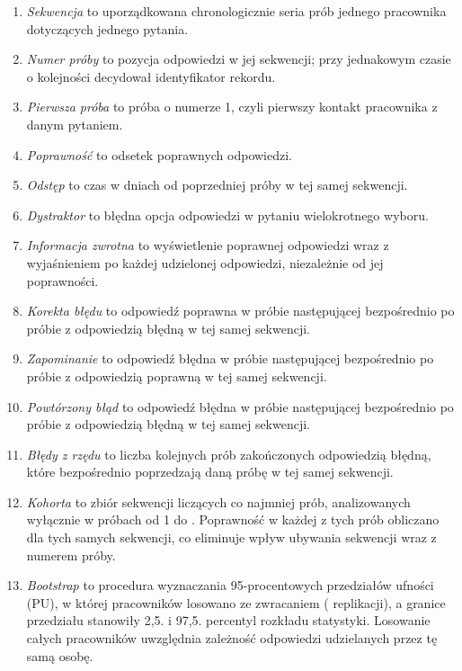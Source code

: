 \begin{enumerate}[label=\Roman*.]
  \item \emph{Sekwencja} to uporządkowana chronologicznie seria prób jednego pracownika dotyczących
  jednego pytania.
  \item \emph{Numer próby} to pozycja odpowiedzi w jej sekwencji; przy jednakowym czasie o kolejności
  decydował identyfikator rekordu.
  \item \emph{Pierwsza próba} to próba o numerze 1, czyli pierwszy kontakt pracownika z danym pytaniem.
  \item \emph{Poprawność} to odsetek poprawnych odpowiedzi.
  \item \emph{Odstęp} to czas w dniach od poprzedniej próby w tej samej sekwencji.
  \item \emph{Dystraktor} to błędna opcja odpowiedzi w pytaniu wielokrotnego wyboru.
  \item \emph{Informacja zwrotna} to wyświetlenie poprawnej odpowiedzi wraz z wyjaśnieniem po każdej
  udzielonej odpowiedzi, niezależnie od jej poprawności.
  \item \emph{Korekta błędu} to odpowiedź poprawna w próbie następującej bezpośrednio po próbie
  z odpowiedzią błędną w tej samej sekwencji.
  \item \emph{Zapominanie} to odpowiedź błędna w próbie następującej bezpośrednio po próbie
  z odpowiedzią poprawną w tej samej sekwencji.
  \item \emph{Powtórzony błąd} to odpowiedź błędna w próbie następującej bezpośrednio po próbie
  z odpowiedzią błędną w tej samej sekwencji.
  \item \emph{Błędy z rzędu} to liczba kolejnych prób zakończonych odpowiedzią błędną, które
  bezpośrednio poprzedzają daną próbę w tej samej sekwencji.
  \item \emph{Kohorta} to zbiór sekwencji liczących co najmniej \CohortK{} prób, analizowanych
  wyłącznie w próbach od 1 do \CohortK{}. Poprawność w każdej z tych prób obliczano dla tych samych
  sekwencji, co eliminuje wpływ ubywania sekwencji wraz z numerem próby.
  \item \emph{Bootstrap} to procedura wyznaczania 95-procentowych przedziałów ufności (PU), w której
  pracowników losowano ze zwracaniem (\BootReps{} replikacji), a granice przedziału stanowiły 2,5.
  i 97,5. percentyl rozkładu statystyki. Losowanie całych pracowników uwzględnia zależność odpowiedzi
  udzielanych przez tę samą osobę.
\end{enumerate}
